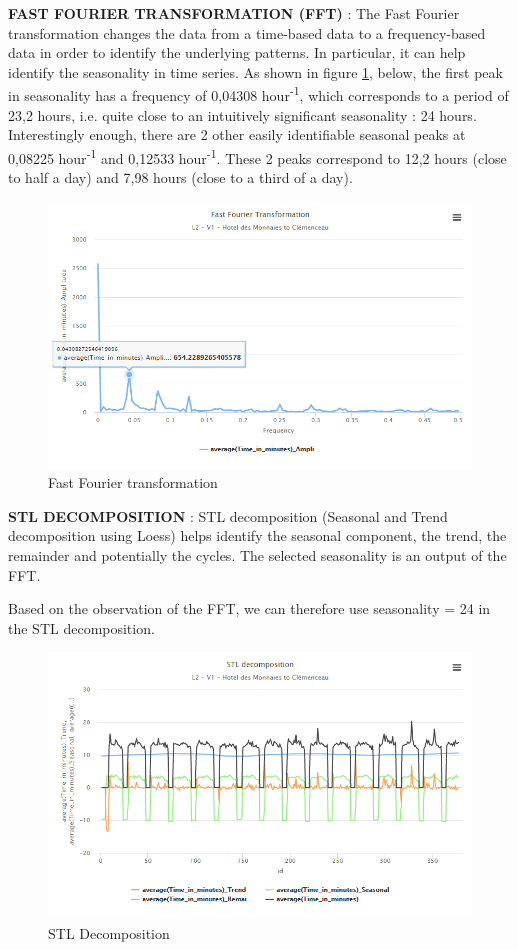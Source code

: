 \documentclass{article}
\begin{document}
\textbf{FAST FOURIER TRANSFORMATION (FFT)} : The Fast Fourier transformation changes the data from a time-based data to a frequency-based data in order to identify the underlying patterns. In particular, it can help identify the seasonality in time series. As shown in figure \ref{fig:fft}, below, the first peak in seasonality has a frequency of 0,04308 hour\textsuperscript{-1}, which corresponds to a period of 23,2 hours, i.e. quite close to an intuitively significant seasonality : 24 hours. Interestingly enough, there are 2 other easily identifiable seasonal peaks at 0,08225 hour\textsuperscript{-1} and 0,12533 hour\textsuperscript{-1}. These 2 peaks correspond to 12,2 hours (close to half a day) and 7,98 hours (close to a third of a day).

 \begin{figure}[H]
    \centering
    \includegraphics[width=\textwidth]{images/Fig2.png} 
    \caption{Fast Fourier transformation}
    \label{fig:fft}
\end{figure}


\textbf{STL DECOMPOSITION} : STL decomposition (Seasonal and Trend decomposition using Loess) helps identify the seasonal component, the trend, the remainder and potentially the cycles. The selected seasonality is an output of the FFT.

Based on the observation of the FFT, we can therefore use seasonality = 24 in the STL decomposition.

 \begin{figure}[H]
    \centering
    \includegraphics[width=\textwidth]{images/Fig3.png} 
    \caption{STL Decomposition}
    \label{fig:stl}
\end{figure}
\end{document}
